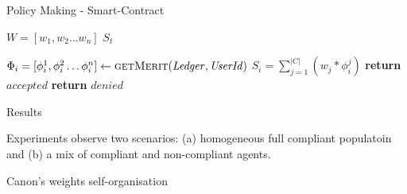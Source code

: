 \documentclass[xcolor={table}]{beamer}
\begin{document}
\begin{frame}[fragile=singleslide,t]
\begin{columns}[onlytextwidth,T]
\begin{column}{.48\textwidth}
\begin{block}{Policy Making - Smart-Contract}
\begin{center}
\begin{minipage}{0.8\textwidth}
\begin{algorithm}[H]
  \footnotesize
\renewcommand\thealgorithm{}
\caption{Smart-Contract}\label{smartcontract}
\begin{algorithmic}[0]
\Require 
\State $W = [w_1, w_2 \dots w_n]$
\State $S_t$

\Statex
{}%
\State $\Phi_i = [\phi^1_i, \phi^2_i \dots \phi^n_i] \gets \Call{getMerit}{\mathit{Ledger}, \mathit{UserId}}$
\State $S_i = \sum_{j=1}^{|C|} \left ( w_j * \phi_{i}^{j} \right)$
    \State \textbf{return} $\textit{accepted}$
\Else
    \State \textbf{return} $\textit{denied}$
\EndIf
\EndProcedure
\end{algorithmic}
\end{algorithm}
\end{minipage}
\end{center}


\end{block}

\begin{block}{Results}

Experiments observe two scenarios: (a) homogeneous full compliant populatoin and (b) a mix of compliant and non-compliant agents. %
\end{block}

\begin{block}{Canon's weights self-organisation}

\begin{figure}
\centering


\end{figure}
\end{block}
\end{column}
\end{columns}
\end{frame}
\end{document}
